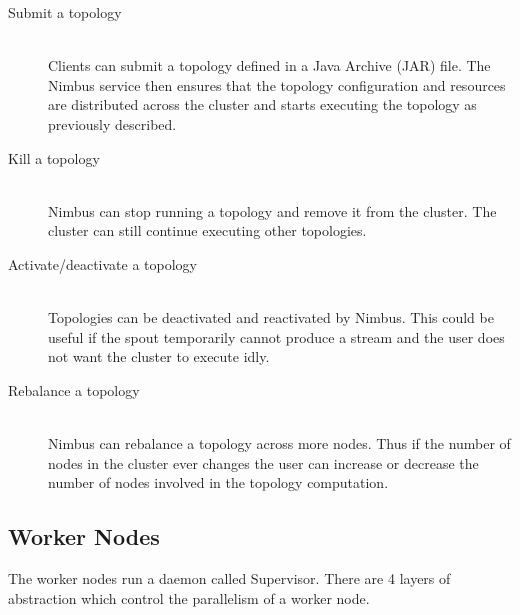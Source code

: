 \documentclass[bsc,twoside,singlespacing,normalheadings,parskip]{infthesis}\usepackage[]{graphicx}\usepackage[]{color}
\begin{document}
\begin{description}
	\item[Submit a topology] \hfill \\
	Clients can submit a topology defined in a Java Archive (JAR) file. The Nimbus service then ensures that the topology configuration and resources are distributed across the cluster and starts executing the topology as previously described.
	\item[Kill a topology] \hfill \\
	Nimbus can stop running a topology and remove it from the cluster. The cluster can still continue executing other topologies.
	\item[Activate/deactivate a topology] \hfill \\
	Topologies can be deactivated and reactivated by Nimbus. This could be useful if the spout temporarily cannot produce a stream and the user does not want the cluster to execute idly.
	\item[Rebalance a topology] \hfill \\
	Nimbus can rebalance a topology across more nodes. Thus if the number of nodes in the cluster ever changes the user can increase or decrease the number of nodes involved in the topology computation.
\end{description}

\subsection{Worker Nodes}

The worker nodes run a daemon called Supervisor. There are 4 layers of abstraction which control the parallelism of a worker node.
\end{document}
